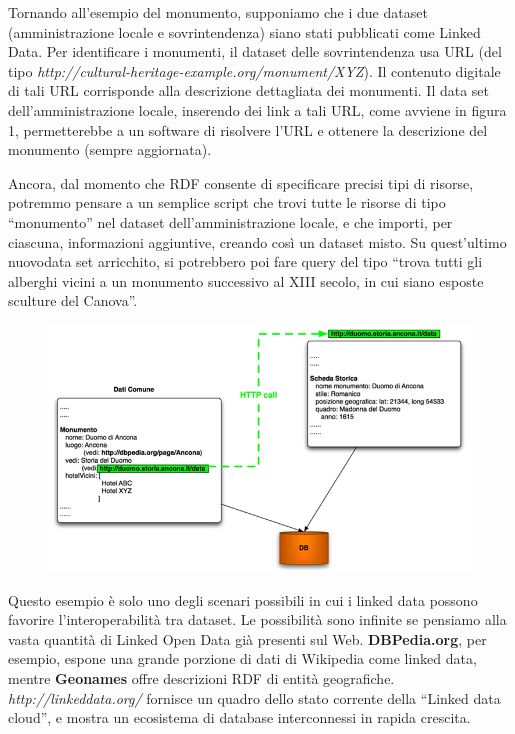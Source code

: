 Tornando all’esempio del monumento, supponiamo che i due dataset (amministrazione locale e sovrintendenza) siano stati pubblicati come Linked Data. Per identificare i monumenti, il dataset delle sovrintendenza usa URL (del tipo \emph{http://cultural-heritage-example.org/monument/XYZ}). Il contenuto digitale di tali URL corrisponde alla descrizione dettagliata dei monumenti.
Il data set dell’amministrazione locale, inserendo dei link a tali URL, come avviene in figura 1, permetterebbe a un software di risolvere l’URL e ottenere la descrizione del monumento (sempre aggiornata).

Ancora, dal momento che RDF consente di specificare precisi tipi di risorse, potremmo pensare a un semplice script che trovi tutte le risorse di tipo “monumento” nel dataset dell’amministrazione locale, e che importi, per ciascuna, informazioni aggiuntive, creando così un dataset misto. Su quest’ultimo nuovodata set arricchito, si potrebbero poi fare query del tipo “trova tutti gli alberghi vicini a un monumento successivo al XIII secolo, in cui siano esposte sculture del Canova”.
 
\begin{figure}[htbp]
  \centering
  \includegraphics[width=.8\textwidth]
    {./images/img2}
\end{figure}

Questo esempio è solo uno degli scenari possibili in cui i linked data possono favorire l’interoperabilità tra dataset. Le possibilità sono infinite se pensiamo alla vasta quantità di Linked Open Data già presenti sul Web. \textbf{DBPedia.org}, per esempio, espone una grande porzione di dati di Wikipedia come linked data, mentre \textbf{Geonames} offre descrizioni RDF di entità geografiche. \emph{http://linkeddata.org/} fornisce un quadro dello stato corrente della “Linked data cloud”, e mostra un ecosistema di database interconnessi in rapida crescita.